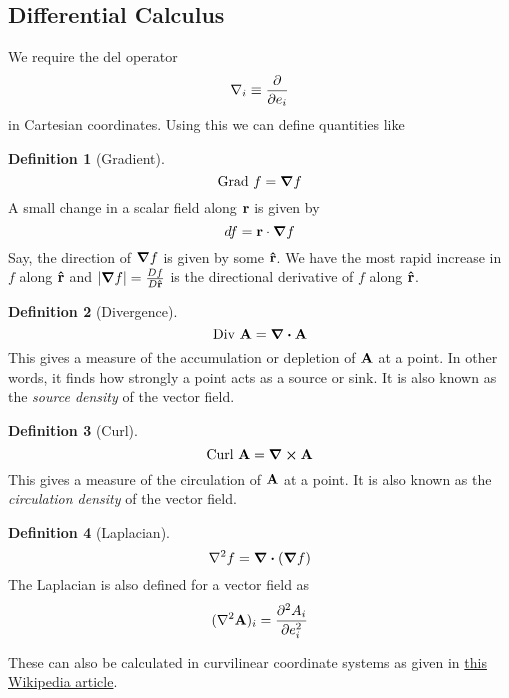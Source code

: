 \documentclass[10pt, a4paper]{extarticle}
\theoremstyle{definition}
\newtheorem{defn}{Definition}
\begin{document}
\subsection{Differential Calculus}
We require the del operator
\[\nabla_i\equiv\pdv{}{e_i}\] in Cartesian coordinates. Using this we can define quantities like
\begin{framed}
	\begin{defn}[Gradient]
		\[\text{Grad }f=\grad f\]
		A small change in a scalar field along $\vb{r}$ is given by
		\[df=\vb{r}\cdot\grad f\]
		Say, the direction of $\grad f$ is given by some $\vu{r}$. We have the most rapid increase in $f$ along $\vu{r}$ and $|\grad f|=\frac{Df}{D\vu{r}}$ is the directional derivative of $f$ along $\vu{r}$.
	\end{defn}

	\begin{defn}[Divergence]
		\[\text{Div }\vb{A}=\div\vb{A}\]
		This gives a measure of the accumulation or depletion of $\vb{A}$ at a point. In other words, it finds how strongly a point acts as a source or sink. It is also known as the \emph{source density} of the vector field.
	\end{defn}

	\begin{defn}[Curl]
		\[\text{Curl }\vb{A}=\curl\vb{A}\]
		This gives a measure of the circulation of $\vb{A}$ at a point. It is also known as the \emph{circulation density} of the vector field.
	\end{defn}

	\begin{defn}[Laplacian]
		\[\laplacian f=\div(\grad f)\]
		The Laplacian is also defined for a vector field as
		\[(\laplacian\vb{A})_i=\pdv[2]{A_i}{e_i}\]
	\end{defn}
\end{framed}
These can also be calculated in curvilinear coordinate systems as given in \href{https://en.wikipedia.org/wiki/Del_in_cylindrical_and_spherical_coordinates}{this Wikipedia article}.
\end{document}
